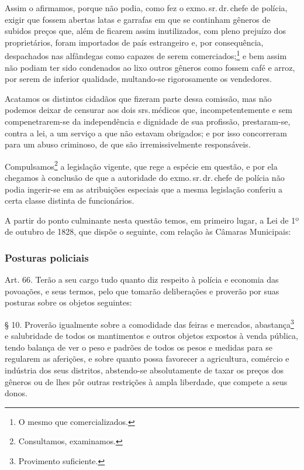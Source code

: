 Assim o afirmamos, porque não podia, como fez o exmo.\,sr.\,dr.\,chefe de
polícia, exigir que fossem abertas latas e garrafas em que se continham
gêneros de subidos preços que, além de ficarem assim inutilizados, com
pleno prejuízo dos proprietários, foram importados de país estrangeiro
e, por consequência, despachados nas alfândegas como capazes de serem
comerciados;\footnote{O mesmo que comercializados.} e bem assim não
podiam ter sido condenados ao lixo outros gêneros como fossem café e
arroz, por serem de inferior qualidade, multando-se rigorosamente os
vendedores.

Acatamos os distintos cidadãos que fizeram parte dessa comissão, mas não
podemos deixar de censurar aos dois srs.\,médicos que, incompetentemente
e sem compenetrarem-se da independência e dignidade de sua profissão,
prestaram-se, contra a lei, a um serviço a que não estavam obrigados; e
por isso concorreram para um abuso criminoso, de que são
irremissivelmente responsáveis.

Compulsamos\footnote{Consultamos, examinamos.} a legislação vigente,
que rege a espécie em questão, e por ela chegamos à conclusão de que a
autoridade do exmo.\,sr.\,dr.\,chefe de polícia não podia ingerir-se em as
atribuições especiais que a mesma legislação conferiu a certa classe
distinta de funcionários.

A partir do ponto culminante nesta questão temos, em primeiro lugar, a
Lei de 1º de outubro de 1828, que dispõe o seguinte, com relação às
Câmaras Municipais:

\subsubsection{Posturas policiais}

Art. 66. Terão a seu cargo tudo quanto diz respeito à polícia e economia
das povoações, e seus termos, pelo que tomarão deliberações e proverão
por suas posturas sobre os objetos seguintes:

\noindent\dotfill

§ 10. Proverão igualmente sobre a comodidade das feiras e mercados,
abastança\footnote{Provimento suficiente.} e salubridade de todos os
mantimentos e outros objetos expostos à venda pública, tendo balança de
ver o peso e padrões de todos os pesos e medidas para se regularem as
aferições, e sobre quanto possa favorecer a agricultura, comércio e
indústria dos seus distritos, abstendo-se absolutamente de taxar os
preços dos gêneros ou de lhes pôr outras restrições à ampla liberdade,
que compete a seus donos.

